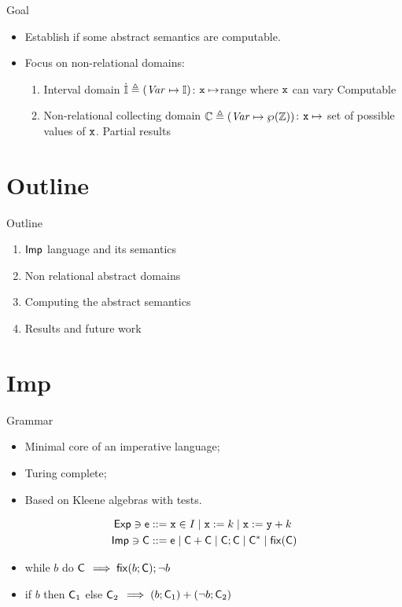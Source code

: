 \documentclass[presentation]{beamer}
\begin{document}
\begin{frame}[label={sec:org269b413}]{Goal}
\begin{itemize}
\item Establish if some abstract semantics are computable.
\item Focus on non-relational domains:
\begin{enumerate}
\item \alert{Interval domain} \(\inte \defin (\Var \mapsto \Int)\):
\(\var\mapsto\)range where \(\var\) can vary 
\alert{Computable}
\item {} \alert{Non-relational collecting domain} \(\bCnr \defin
        (\Var \mapsto \poset{\z})\): \(\var\mapsto\) set of possible
values of \(\var\).  \alert{Partial results}
\end{enumerate}
\end{itemize}
\end{frame}
\section{Outline}
\label{sec:org9bb4d0e}
\begin{frame}[label={sec:orgf854a45}]{Outline}
\begin{enumerate}
\item \(\imp\) language and its semantics
\item Non relational abstract domains
\item Computing the abstract semantics
\item Results and future work
\end{enumerate}
\end{frame}
\section{Imp}
\label{sec:org3f322a0}
\begin{frame}[label={sec:orgfbc9ae4}]{Grammar}
\begin{itemize}
\item Minimal core of an imperative language;
\item Turing complete;
\item Based on Kleene algebras with tests.
\end{itemize}


\begin{align*}
  \expr \ni \com[e] ::= & \; \var \in I \mid \var := k \mid \var := \var[y] + k \\
  \imp \ni \com[C] ::= & \; \com[e] \mid \com + \com \mid \com ; \com \mid \com^* \mid \fix{\com}
\end{align*}

\begin{itemize}
\item while \(b\) do \(\com\) \(\implies \fix{b \seq \com} \seq
     \neg b\)
\item if \(b\) then \(\com_1\) else \(\com_2\) \(\implies (b \seq
     \com_1) \ndet (\neg b \seq\com_2)\)
\end{itemize}
\end{frame}
\end{document}
